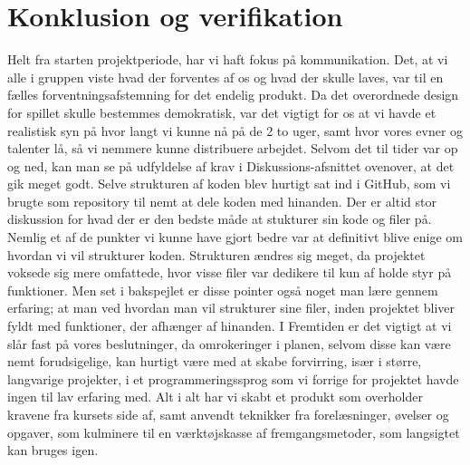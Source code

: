 \chapter{Konklusion og verifikation} \label{chap:konklusion}


Helt fra starten projektperiode, har vi haft fokus på kommunikation. Det, at vi alle i gruppen viste hvad der forventes af os og hvad der skulle laves, var til en fælles forventningsafstemning for det endelig produkt. Da det overordnede design for spillet skulle bestemmes demokratisk, var det vigtigt for os at vi havde et realistisk syn på hvor langt vi kunne nå på de 2 to uger, samt hvor vores evner og talenter lå, så vi nemmere kunne distribuere arbejdet.
Selvom det til tider var op og ned, kan man se på udfyldelse af krav i Diskussions-afsnittet ovenover, at det gik meget godt. Selve strukturen af koden blev hurtigt sat ind i GitHub, som vi brugte som repository til nemt at dele koden med hinanden. Der er altid stor diskussion for hvad der er den bedste måde at stukturer sin kode og filer på. Nemlig et af de punkter vi kunne have gjort bedre var at definitivt blive enige om hvordan vi vil strukturer koden. Strukturen ændres sig meget, da projektet voksede sig mere omfattede, hvor visse filer var dedikere til kun af holde styr på funktioner. Men set i bakspejlet er disse pointer også noget man lære gennem erfaring; at man ved hvordan man vil strukturer sine filer, inden projektet bliver fyldt med funktioner, der afhænger af hinanden. I Fremtiden er det vigtigt at vi slår fast på vores beslutninger, da omrokeringer i planen, selvom disse kan være nemt forudsigelige, kan hurtigt være med at skabe forvirring, især i større, langvarige projekter, i et programmeringssprog som vi forrige for projektet havde ingen til lav erfaring med. Alt i alt har vi skabt et produkt som overholder kravene fra kursets side af, samt anvendt teknikker fra forelæsninger, øvelser og opgaver, som kulminere til en værktøjskasse af fremgangsmetoder, som langsigtet kan bruges igen.
